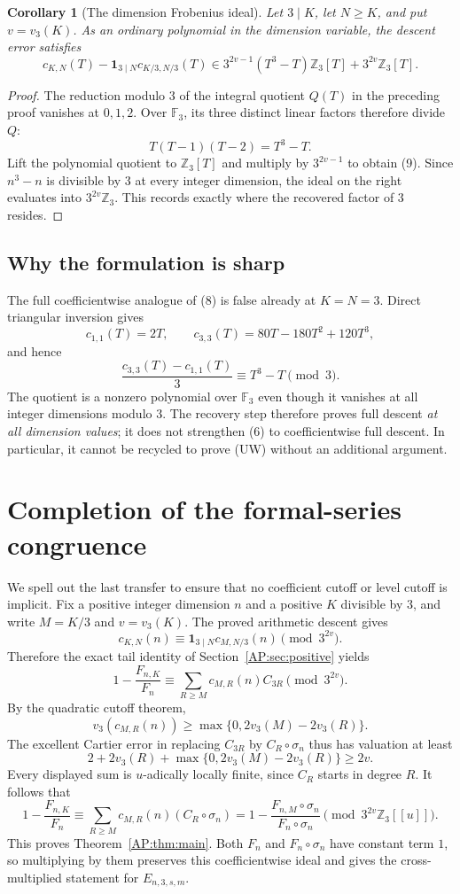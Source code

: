 \documentclass[11pt,a4paper]{article}
\newtheorem{corollary}[theorem]{Corollary}
\theoremstyle{definition}\newtheorem{definition}[theorem]{Definition}
\theoremstyle{remark}\newtheorem{remark}[theorem]{Remark}
\numberwithin{equation}{section}
\begin{document}
\begin{corollary}[The dimension Frobenius ideal]
Let $3\mid K$, let $N\ge K$, and put $v=v_3(K)$.  As an ordinary
polynomial in the dimension variable, the descent error satisfies
\[
 \boxed{\;
 c_{K,N}(T)-\mathbf1_{3\mid N}c_{K/3,N/3}(T)
 \in3^{2v-1}(T^3-T)\mathbb Z_3[T]
                     +3^{2v}\mathbb Z_3[T].\;}
\tag{9}
\]
\end{corollary}
\begin{proof}
The reduction modulo $3$ of the integral quotient $Q(T)$ in the
preceding proof vanishes at $0,1,2$.  Over $\mathbb F_3$, its three
distinct linear factors therefore divide $Q$:
\[
 T(T-1)(T-2)=T^3-T.
\]
Lift the polynomial quotient to $\mathbb Z_3[T]$ and multiply by
$3^{2v-1}$ to obtain (9).  Since $n^3-n$ is divisible by $3$ at
every integer dimension, the ideal on the right evaluates into
$3^{2v}\mathbb Z_3$.  This records exactly where the recovered
factor of $3$ resides.
\end{proof}

\subsection{Why the formulation is sharp}
The full coefficientwise analogue of (8) is false already at
$K=N=3$.  Direct triangular inversion gives
\[
 c_{1,1}(T)=2T,\qquad c_{3,3}(T)=80T-180T^2+120T^3,
\]
and hence
\[
 \frac{c_{3,3}(T)-c_{1,1}(T)}3\equiv T^3-T\pmod3.
\]
The quotient is a nonzero polynomial over $\mathbb F_3$ even though
it vanishes at all integer dimensions modulo $3$.  The recovery step
therefore proves full descent \emph{at all dimension values}; it does
not strengthen (6) to coefficientwise full descent.  In particular,
it cannot be recycled to prove (UW) without an additional argument.

\section{Completion of the formal-series congruence}\label{AP:source-main-6}\label{AP:sec:completion}
We spell out the last transfer to ensure that no coefficient cutoff or
level cutoff is implicit.  Fix a positive integer dimension $n$ and a
positive $K$ divisible by $3$, and write $M=K/3$ and $v=v_3(K)$.
The proved arithmetic descent gives
\[
 c_{K,N}(n)\equiv
    \mathbf1_{3\mid N}c_{M,N/3}(n)\pmod{3^{2v}}.
\]
Therefore the exact tail identity of Section~\ref{AP:sec:positive} yields
\[
 1-\frac{F_{n,K}}{F_n}
 \equiv\sum_{R\ge M}c_{M,R}(n)C_{3R}\pmod{3^{2v}}.
\]
By the quadratic cutoff theorem,
\[
 v_3(c_{M,R}(n))\ge
          \max\{0,2v_3(M)-2v_3(R)\}.
\]
The excellent Cartier error in replacing $C_{3R}$ by
$C_R\circ\sigma_n$ thus has valuation at least
\[
 2+2v_3(R)+\max\{0,2v_3(M)-2v_3(R)\}\ge2v.
\]
Every displayed sum is $u$-adically locally finite, since $C_R$ starts
in degree $R$.  It follows that
\[
 1-\frac{F_{n,K}}{F_n}
 \equiv\sum_{R\ge M}c_{M,R}(n)(C_R\circ\sigma_n)
 =1-\frac{F_{n,M}\circ\sigma_n}{F_n\circ\sigma_n}
                      \pmod{3^{2v}\mathbb Z_3[[u]]}.
\]
This proves Theorem~\ref{AP:thm:main}.  Both $F_n$ and
$F_n\circ\sigma_n$ have constant term $1$, so multiplying by them
preserves this coefficientwise ideal and gives the cross-multiplied
statement for $E_{n,3,s,m}$.
\end{document}
